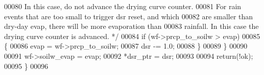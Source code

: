\begin{DoxyCode}
00080 \textcolor{comment}{        In this case, do not advance the drying curve counter.}
00081 \textcolor{comment}{        For rain events that are too small to trigger dsr reset, and which}
00082 \textcolor{comment}{        are smaller than dry-day evap, there will be more evaporation than}
00083 \textcolor{comment}{        rainfall.  In this case the drying curve counter is advanced. */}
00084         \textcolor{keywordflow}{if} (wf->prcp\_to\_soilw > evap)
00085         \{
00086             evap = wf->prcp\_to\_soilw;
00087             dsr -= 1.0;
00088         \}
00089     \}
00090 
00091     wf->soilw\_evap = evap;
00092     *dsr\_ptr = dsr;
00093     
00094     \textcolor{keywordflow}{return}(!ok);
00095 \}
00096 
\end{DoxyCode}
